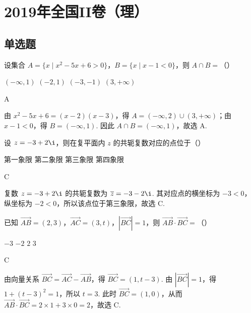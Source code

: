 \chapter{2019年全国II卷（理）}

\section{单选题}

\begin{problem}
设集合 \(A=\{x\mid x^2-5x+6>0\}\)，\(B=\{x\mid x-1<0\}\)，则 \(A\cap B=\)（\quad）

\choices
    {\((-\infty,1)\)}
    {\((-2,1)\)}
    {\((-3,-1)\)}
    {\((3,+\infty)\)}
\end{problem}

\begin{answer}
A
\end{answer}

\begin{solution}
由 \(x^2-5x+6=(x-2)(x-3)\)，得 \(A=(-\infty,2)\cup(3,+\infty)\)；由 \(x-1<0\)，得 \(B=(-\infty,1)\). 因此 \(A\cap B=(-\infty,1)\)，故选 A.
\end{solution}

\begin{problem}
设 \(z=-3+2\i\)，则在复平面内 \(z\) 的共轭复数对应的点位于（\quad）

\choices
    {第一象限}
    {第二象限}
    {第三象限}
    {第四象限}
\end{problem}

\begin{answer}
C
\end{answer}

\begin{solution}
复数 \(z=-3+2\i\) 的共轭复数为 \(\overline z=-3-2\i\). 其对应点的横坐标为 \(-3<0\)，纵坐标为 \(-2<0\)，所以该点位于第三象限，故选 C.
\end{solution}

\begin{problem}
已知 \(\overrightarrow{AB}=(2,3)\)，\(\overrightarrow{AC}=(3,t)\)，\(|\overrightarrow{BC}|=1\)，则 \(\overrightarrow{AB}\cdot\overrightarrow{BC}=\)（\quad）

\choices
    {\(-3\)}
    {\(-2\)}
    {\(2\)}
    {\(3\)}
\end{problem}

\begin{answer}
C
\end{answer}

\begin{solution}
由向量关系 \(\overrightarrow{BC}=\overrightarrow{AC}-\overrightarrow{AB}\)，得 \(\overrightarrow{BC}=(1,t-3)\). 由 \(|\overrightarrow{BC}|=1\)，得 \(1+(t-3)^2=1\)，所以 \(t=3\). 此时 \(\overrightarrow{BC}=(1,0)\)，从而 \(\overrightarrow{AB}\cdot\overrightarrow{BC}=2\times1+3\times0=2\)，故选 C.
\end{solution}

